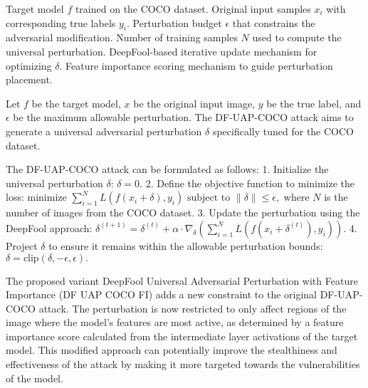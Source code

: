 Target model \( f \) trained on the COCO dataset.  
Original input samples \( x_i \) with corresponding true labels \( y_i \).  
Perturbation budget \( \epsilon \) that constrains the adversarial modification.  
Number of training samples \( N \) used to compute the universal perturbation.  
DeepFool-based iterative update mechanism for optimizing \( \delta \).  
Feature importance scoring mechanism to guide perturbation placement.


Let \( f \) be the target model, \( x \) be the original input image, \( y \) be the true label, and \( \epsilon \) be the maximum allowable perturbation. The DF-UAP-COCO attack aims to generate a universal adversarial perturbation \( \delta \) specifically tuned for the COCO dataset.

The DF-UAP-COCO attack can be formulated as follows:
1. Initialize the universal perturbation \( \delta \):
   $
   \delta = 0.
   $
2. Define the objective function to minimize the loss:
   $
   \text{minimize } \sum_{i=1}^{N} L(f(x_i + \delta), y_i) \text{ subject to } \|\delta\| \leq \epsilon,
   $
   where \( N \) is the number of images from the COCO dataset.
3. Update the perturbation using the DeepFool approach:
   $
   \delta^{(t+1)} = \delta^{(t)} + \alpha \cdot \nabla_{\delta} \left( \sum_{i=1}^{N} L(f(x_i + \delta^{(t)}), y_i) \right).
   $
4. Project \( \delta \) to ensure it remains within the allowable perturbation bounds:
   $
   \delta = \text{clip}(\delta, -\epsilon, \epsilon).
   $

The proposed variant DeepFool Universal Adversarial Perturbation with Feature Importance (DF UAP COCO FI) adds a new constraint to the original DF-UAP-COCO attack. The perturbation is now restricted to only affect regions of the image where the model's features are most active, as determined by a feature importance score calculated from the intermediate layer activations of the target model. This modified approach can potentially improve the stealthiness and effectiveness of the attack by making it more targeted towards the vulnerabilities of the model.